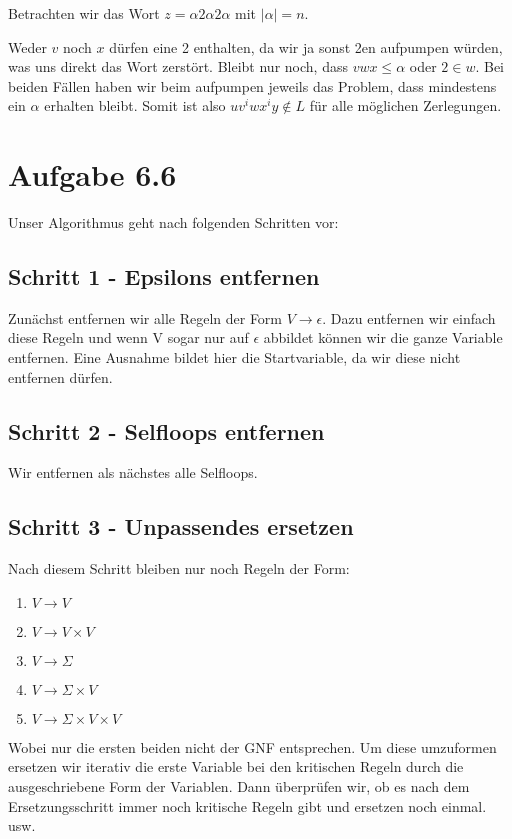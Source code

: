 \documentclass{article}
\begin{document}
Betrachten wir das Wort $z = \alpha 2 \alpha 2 \alpha$ mit $|\alpha|=n$.

Weder $v$ noch $x$ dürfen eine 2 enthalten, da wir ja sonst 2en aufpumpen würden, was uns direkt das Wort zerstört. Bleibt nur noch, dass $vwx \leq \alpha$ oder $2 \in w$. Bei beiden Fällen haben wir beim aufpumpen jeweils das Problem, dass mindestens ein $\alpha$ erhalten bleibt. Somit ist also $uv^iwx^iy \notin L$ für alle möglichen Zerlegungen.



\section*{Aufgabe 6.6}
Unser Algorithmus geht nach folgenden Schritten vor:
\subsection*{Schritt 1 - Epsilons entfernen}
Zunächst entfernen wir alle Regeln der Form $V\rightarrow \epsilon$. Dazu entfernen wir einfach diese Regeln und wenn V sogar nur auf $\epsilon$ abbildet können wir die ganze Variable entfernen. Eine Ausnahme bildet hier die Startvariable, da wir diese nicht entfernen dürfen.

\subsection*{Schritt 2 - Selfloops entfernen}
Wir entfernen als nächstes alle Selfloops.

\subsection*{Schritt 3 - Unpassendes ersetzen}
Nach diesem Schritt bleiben nur noch Regeln der Form:
\begin{enumerate}
  \item $V \rightarrow V$
  \item $V \rightarrow V\times V$
  \item $V \rightarrow \Sigma$
  \item $V \rightarrow \Sigma \times V$
  \item $V \rightarrow \Sigma \times V \times V$
\end{enumerate}
Wobei nur die ersten beiden nicht der GNF entsprechen. Um diese umzuformen ersetzen wir iterativ die erste Variable bei den kritischen Regeln durch die ausgeschriebene Form der Variablen. Dann überprüfen wir, ob es nach dem Ersetzungsschritt immer noch kritische Regeln gibt und ersetzen noch einmal. usw.
\end{document}
